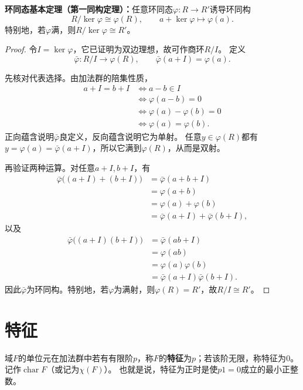 \begin{theorem}\label{p2:ring-first-iso}
\textbf{环同态基本定理（第一同构定理）：}任意环同态$\varphi:R\to R'$诱导环同构
\[
R/\ker\varphi\cong\varphi(R),\qquad a+\ker\varphi\longmapsto\varphi(a).
\]
特别地，若$\varphi$满，则$R/\ker\varphi\cong R'$。
\end{theorem}
\begin{proof}
令$I=\ker\varphi$，它已证明为双边理想，故可作商环$R/I$。
定义
\[
\bar\varphi:R/I\longrightarrow\varphi(R),\qquad
\bar\varphi(a+I)=\varphi(a).
\]

先核对代表选择。由加法群的陪集性质，
\[
\begin{aligned}
a+I=b+I
&\iff a-b\in I\\
&\iff\varphi(a-b)=0\\
&\iff\varphi(a)-\varphi(b)=0\\
&\iff\varphi(a)=\varphi(b).
\end{aligned}
\]
正向蕴含说明$\bar\varphi$良定义，反向蕴含说明它为单射。
任意$y\in\varphi(R)$都有$y=\varphi(a)=\bar\varphi(a+I)$，所以它满到$\varphi(R)$，从而是双射。

再验证两种运算。对任意$a+I,b+I$，有
\[
\begin{aligned}
\bar\varphi\bigl((a+I)+(b+I)\bigr)
&=\bar\varphi(a+b+I)\\
&=\varphi(a+b)\\
&=\varphi(a)+\varphi(b)\\
&=\bar\varphi(a+I)+\bar\varphi(b+I),
\end{aligned}
\]
以及
\[
\begin{aligned}
\bar\varphi\bigl((a+I)(b+I)\bigr)
&=\bar\varphi(ab+I)\\
&=\varphi(ab)\\
&=\varphi(a)\varphi(b)\\
&=\bar\varphi(a+I)\bar\varphi(b+I).
\end{aligned}
\]
因此$\bar\varphi$为环同构。特别地，若$\varphi$为满射，则$\varphi(R)=R'$，故$R/I\cong R'$。
\end{proof}
\section{特征}
\begin{definition}
\label{p2:concept:c1-l1442}域$F$的单位元在加法群中若有有限阶$p$，称$F$的\textbf{特征}为$p$；若该阶无限，称特征为$0$。
记作$\operatorname{char}F$（或记为$\chi(F)$）。
也就是说，特征为正时是使$p1=0$成立的最小正整数。
\end{definition}

